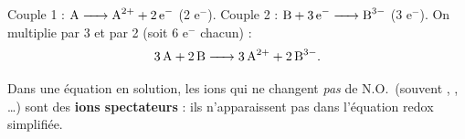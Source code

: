 \documentclass[11pt,a4paper]{article}
\newcommand{\NO}{\ensuremath{\mathrm{N.O.}}}
\begin{document}
\begin{exemple}
Couple 1 : $\ce{A -> A^{2+} + 2 e^-}$ (2 e$^-$). Couple 2 : $\ce{B + 3 e^- -> B^{3-}}$ (3 e$^-$).
On multiplie par 3 et par 2 (soit 6 e$^-$ chacun) :
\[
\ce{3 A + 2 B -> 3 A^{2+} + 2 B^{3-}}.
\]
\end{exemple}

\begin{attention}
Dans une équation en solution, les ions qui ne changent \emph{pas} de \NO\ (souvent ,
, \ldots) sont des \textbf{ions spectateurs} : ils n'apparaissent pas dans
l'équation redox simplifiée.
\end{attention}
\end{document}

